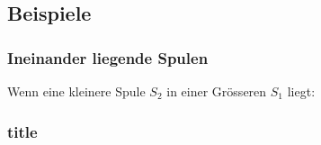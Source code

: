 \subsection{Beispiele}
    \subsubsection{Ineinander liegende Spulen}
        Wenn eine kleinere Spule $S_2$ in einer Grösseren $S_1$ liegt: 
    
    \subsubsection{title}